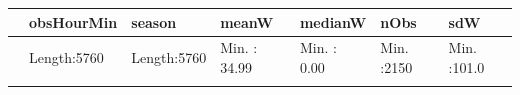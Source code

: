 \documentclass[]{article}
\begin{document}
\begin{longtable}[]{@{}lllllll@{}}
\toprule
\begin{minipage}[b]{0.03\columnwidth}\raggedright\strut
\strut
\end{minipage} & \begin{minipage}[b]{0.14\columnwidth}\raggedright\strut
obsHourMin\strut
\end{minipage} & \begin{minipage}[b]{0.14\columnwidth}\raggedright\strut
season\strut
\end{minipage} & \begin{minipage}[b]{0.13\columnwidth}\raggedright\strut
meanW\strut
\end{minipage} & \begin{minipage}[b]{0.13\columnwidth}\raggedright\strut
medianW\strut
\end{minipage} & \begin{minipage}[b]{0.11\columnwidth}\raggedright\strut
nObs\strut
\end{minipage} & \begin{minipage}[b]{0.12\columnwidth}\raggedright\strut
sdW\strut
\end{minipage}\tabularnewline
\midrule
\endhead
\begin{minipage}[t]{0.03\columnwidth}\raggedright\strut
\strut
\end{minipage} & \begin{minipage}[t]{0.14\columnwidth}\raggedright\strut
Length:5760\strut
\end{minipage} & \begin{minipage}[t]{0.14\columnwidth}\raggedright\strut
Length:5760\strut
\end{minipage} & \begin{minipage}[t]{0.13\columnwidth}\raggedright\strut
Min. : 34.99\strut
\end{minipage} & \begin{minipage}[t]{0.13\columnwidth}\raggedright\strut
Min. : 0.00\strut
\end{minipage} & \begin{minipage}[t]{0.11\columnwidth}\raggedright\strut
Min. :2150\strut
\end{minipage} & \begin{minipage}[t]{0.12\columnwidth}\raggedright\strut
Min. :101.0\strut
\end{minipage}\tabularnewline
\begin{minipage}[t]{0.03\columnwidth}\raggedright\strut
\strut
\end{minipage} & \begin{minipage}[t]{0.14\columnwidth}\raggedright\strut

\end{minipage}
\end{longtable}
\end{document}
